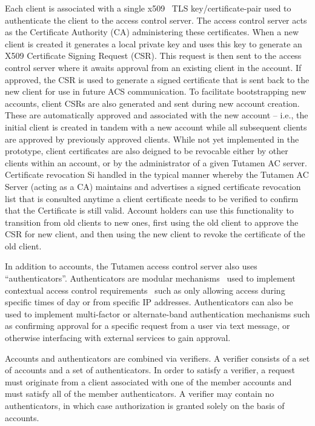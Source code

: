 Each client is associated with a single x509~\cite{rfc5280} TLS
key/certificate-pair used to authenticate the client to the access
control server. The access control server acts as the Certificate
Authority (CA) administering these certificates. When a new client is
created it generates a local private key and uses this key to generate
an X509 Certificate Signing Request (CSR). This request is then sent
to the access control server where it awaits approval from an existing
client in the account. If approved, the CSR is used to generate a
signed certificate that is sent back to the new client for use in
future ACS communication. To facilitate bootstrapping new accounts,
client CSRs are also generated and sent during new account
creation. These are automatically approved and associated with the new
account -- i.e., the initial client is created in tandem with a new
account while all subsequent clients are approved by previously
approved clients. While not yet implemented in the prototype, client
certificates are also deigned to be revocable either by other clients
within an account, or by the administrator of a given Tutamen AC
server. Certificate revocation Si handled in the typical manner
whereby the Tutamen AC Server (acting as a CA) maintains and
advertises a signed certificate revocation list that is consulted
anytime a client certificate needs to be verified to confirm that the
Certificate is still valid. Account holders can use this functionality
to transition from old clients to new ones, first using the old client
to approve the CSR for new client, and then using the new client to
revoke the certificate of the old client.

In addition to accounts, the Tutamen access control server also uses
``authenticators''. Authenticators are modular
mechanisms~\cite{samar1996} used to implement contextual access
control requirements~\cite{hulsebosch2005} such as only allowing
access during specific times of day or from specific IP
addresses. Authenticators can also be used to implement multi-factor
or alternate-band authentication mechanisms such as confirming
approval for a specific request from a user via text message, or
otherwise interfacing with external services to gain approval.

Accounts and authenticators are combined via verifiers. A verifier
consists of a set of accounts and a set of authenticators. In order to
satisfy a verifier, a request must originate from a client associated
with one of the member accounts and must satisfy all of the member
authenticators. A verifier may contain no authenticators, in which
case authorization is granted solely on the basis of accounts.

